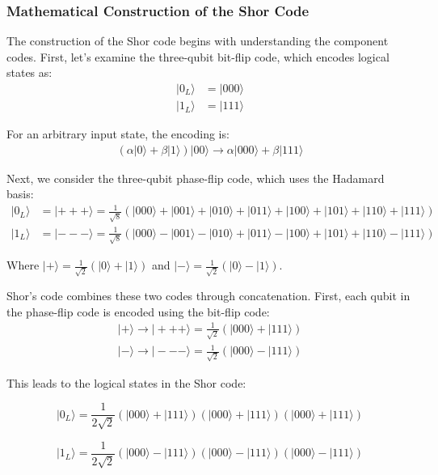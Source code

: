 \documentclass[12pt,a4paper]{article}
\begin{document}
\subsubsection{Mathematical Construction of the Shor Code}

The construction of the Shor code begins with understanding the component codes. First, let's examine the three-qubit bit-flip code, which encodes logical states as:
\begin{align}
|0_L\rangle &= |000\rangle \\
|1_L\rangle &= |111\rangle
\end{align}

For an arbitrary input state, the encoding is:
\begin{align}
(\alpha|0\rangle + \beta|1\rangle)|00\rangle \rightarrow \alpha|000\rangle + \beta|111\rangle
\end{align}

Next, we consider the three-qubit phase-flip code, which uses the Hadamard basis:
\begin{align}
|0_L\rangle &= |{+}{+}{+}\rangle = \frac{1}{\sqrt{8}}(|000\rangle + |001\rangle + |010\rangle + |011\rangle + |100\rangle + |101\rangle + |110\rangle + |111\rangle) \\
|1_L\rangle &= |{-}{-}{-}\rangle = \frac{1}{\sqrt{8}}(|000\rangle - |001\rangle - |010\rangle + |011\rangle - |100\rangle + |101\rangle + |110\rangle - |111\rangle)
\end{align}

Where $|+\rangle = \frac{1}{\sqrt{2}}(|0\rangle + |1\rangle)$ and $|-\rangle = \frac{1}{\sqrt{2}}(|0\rangle - |1\rangle)$.

Shor's code combines these two codes through concatenation. First, each qubit in the phase-flip code is encoded using the bit-flip code:
\begin{align}
|+\rangle \rightarrow |{+}{+}{+}\rangle = \frac{1}{\sqrt{2}}(|000\rangle + |111\rangle) \\
|-\rangle \rightarrow |{-}{-}{-}\rangle = \frac{1}{\sqrt{2}}(|000\rangle - |111\rangle)
\end{align}

This leads to the logical states in the Shor code:

\begin{equation}
    |0_L\rangle = \frac{1}{2\sqrt{2}}(|000\rangle + |111\rangle)(|000\rangle + |111\rangle)(|000\rangle + |111\rangle)
\end{equation}

\begin{equation}
    |1_L\rangle = \frac{1}{2\sqrt{2}}(|000\rangle - |111\rangle)(|000\rangle - |111\rangle)(|000\rangle - |111\rangle)
\end{equation}
\end{document}
